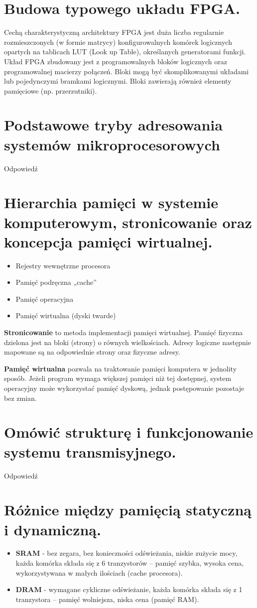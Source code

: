 \documentclass[12pt,a4paper]{article}
\begin{document}
	\section{Budowa typowego układu FPGA.}
	Cechą charakterystyczną architektury FPGA jest duża liczba regularnie rozmieszczonych (w formie matrycy) konfigurowalnych komórek logicznych opartych na tablicach LUT (Look up Table), określanych generatorami funkcji. Układ FPGA zbudowany jest z programowalnych bloków logicznych oraz programowalnej macierzy połączeń. Bloki mogą być skomplikowanymi układami lub pojedynczymi bramkami logicznymi. Bloki zawierają również elementy pamięciowe (np. przerzutniki).

	\section{Podstawowe tryby adresowania systemów mikroprocesorowych}
	Odpowiedź

	\section{Hierarchia pamięci w systemie komputerowym, stronicowanie oraz koncepcja pamięci wirtualnej.}
	\begin{itemize}
		\item Rejestry wewnętrzne procesora
		\item Pamięć podręczna „cache”
		\item Pamięć operacyjna
		\item Pamięć wirtualna (dyski twarde)
	\end{itemize}

	\textbf{Stronicowanie} to metoda implementacji pamięci wirtualnej. Pamięć fizyczna dzielona jest na bloki (strony) o równych wielkościach. Adresy logiczne następnie mapowane są na odpowiednie strony oraz fizyczne adresy.
	
	\textbf{Pamięć wirtualna} pozwala na traktowanie pamięci komputera w jednolity sposób. Jeżeli program wymaga większej pamięci niż tej dostępnej, system operacyjny może wykorzystać pamięć dyskową, jednak postępowanie pozostaje bez zmian.

	\section{Omówić strukturę i funkcjonowanie systemu transmisyjnego.}
	Odpowiedź

	\section{Różnice między pamięcią statyczną i dynamiczną.}
	\begin{itemize}
		\item \textbf{SRAM} - bez zegara, bez konieczności odświeżania, niskie zużycie mocy, każda komórka składa się z 6 tranzystorów -- pamięć szybka, wysoka cena, wykorzystywana w małych ilościach (cache procesora). 
		\item \textbf{DRAM} -  wymagane cykliczne odświeżanie, każda komórka składa się z 1 tranzystora -- pamięć wolniejsza, niska cena (pamięć RAM).
	\end{itemize}
\end{document}
